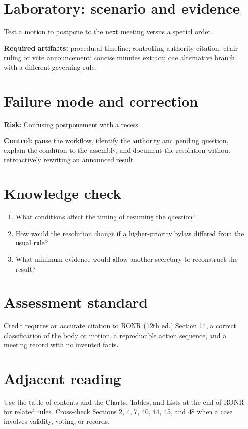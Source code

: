 \documentclass[11pt]{article}
\begin{document}
\section{Laboratory: scenario and evidence}
Test a motion to postpone to the next meeting versus a special order.

\textbf{Required artifacts:} procedural timeline; controlling authority citation; chair ruling or vote announcement; concise minutes extract; one alternative branch with a different governing rule.

\section{Failure mode and correction}
\textbf{Risk:} Confusing postponement with a recess.

\textbf{Control:} pause the workflow, identify the authority and pending question, explain the condition to the assembly, and document the resolution without retroactively rewriting an announced result.

\section{Knowledge check}
\begin{enumerate}[leftmargin=*,itemsep=4pt]
\item What conditions affect the timing of resuming the question?
\item How would the resolution change if a higher-priority bylaw differed from the usual rule?
\item What minimum evidence would allow another secretary to reconstruct the result?
\end{enumerate}

\section{Assessment standard}
Credit requires an accurate citation to RONR (12th ed.) Section 14, a correct classification of the body or motion, a reproducible action sequence, and a meeting record with no invented facts.

\section{Adjacent reading}
Use the table of contents and the Charts, Tables, and Lists at the end of RONR for related rules. Cross-check Sections 2, 4, 7, 40, 44, 45, and 48 when a case involves validity, voting, or records.
\end{document}
